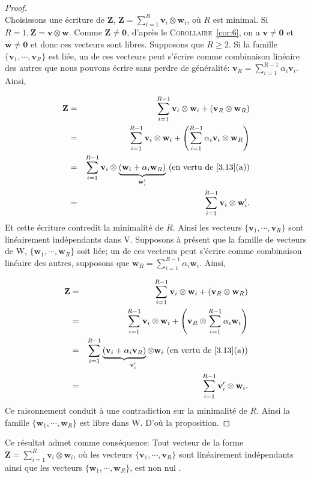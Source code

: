 \documentclass[11pt,a4paper,oneside]{book}
\newtheorem{proof}{Démonstration}
\def\ov{\mathbf 0}
\def\v{\mathbf v}
\def\z{\mathbf Z}
\def\w{\mathbf w}
\newcommand{\corref}[1]{\textsc{Corollaire}~\ref{#1}}
\begin{document}
\begin{proof}
\emph{\\}
Choisissons une écriture de $ \z $, $ \z=\sum_{i=1}^{R}\v_{i}\otimes \w_{i} $, où $ R $ est minimal. Si $ R=1 , \z=\v\otimes \w$. Comme $ \z\neq \ov $, d'après le  \corref{cor:6}, on a $ \v\neq \ov $ et $ \w\neq \ov $ et donc ces vecteurs sont libres. Supposons que $ R\geq 2 $. Si la famille $ \{\v_{1},\cdots,\v_{R}\} $ est liée, un de ces vecteurs peut s'écrire comme combinaison linéaire des autres que nous pouvons écrire sans perdre de généralité: $ \v_{R}=\sum_{i=1}^{R-1}\alpha_{i}\v_{i} $. Ainsi,

\begin{eqnarray}
\z&=&\sum_{i=1}^{R-1}\v_{i}\otimes \w_{i}+(\v_{R}\otimes \w_{R})\nonumber\\
&=&\sum_{i=1}^{R-1} \v_{i}\otimes \w_{i}+\left(\sum_{i=1}^{R-1}\alpha_{i}\v_{i}\otimes \w_{R}\right)\nonumber\\
&=&\sum_{i=1}^{R-1}\v_{i}\otimes\underset{\w'_{i}}{\underbrace{(\w_{i}+\alpha_{i}\w_{R})}} \text{ (en vertu de \eqref{3.13}(a))}\nonumber\\
&=&\sum_{i=1}^{R-1}\v_{i}\otimes \w'_{i}.\nonumber
\end{eqnarray}
 Et cette écriture contredit la minimalité de $ R $. Ainsi les vecteurs $ \{\v_{1},\cdots,\v_{R}\} $ sont linéairement indépendants dans V. Supposons à présent que la famille de vecteurs de W, $ \{\w_{1},\cdots,\w_{R}\} $ soit liée; un de ces vecteurs peut s'écrire comme combinaison linéaire des autres, supposons que $ \w_{R}=\sum_{i=1}^{R-1}\alpha_{i}\w_{i} $. Ainsi,
 
 \begin{eqnarray}
 \z&=&\sum_{i=1}^{R-1} \v_{i}\otimes \w_{i}+(\v_{R}\otimes \w_{R})\nonumber\\
 &=&\sum_{i=1}^{R-1} \v_{i}\otimes \w_{i}+\left(\v_{R}\otimes \sum_{i=1}^{R-1}\alpha_{i}\w_{i}\right)\nonumber\\
 &=&\sum_{i=1}^{R-1}\underset{\v'_{i}}{\underbrace{(\v_{i}+\alpha_{i}\v_{R})}\otimes \w_{i}} \text{ (en vertu de \eqref{3.13}(a))}\nonumber\\
 &=&\sum_{i=1}^{R-1}\v'_{i}\otimes \w_{i}.\nonumber
 \end{eqnarray} Ce raisonnement  conduit à une contradiction sur la minimalité de $ R $. Ainsi la famille $ \{\w_{1},\cdots,\w_{R}\} $ est libre dans W. D'où la proposition.
\end{proof}
Ce résultat admet comme conséquence: Tout vecteur de la forme $ \z=\sum_{i=1}^{R}\v_{i}\otimes \w_{i} $, où les vecteurs $ \{\v_{1},\cdots, \v_{R}\} $ sont linéairement indépendants ainsi que les vecteurs 
$ \{\w_{1},\cdots, \w_{R}\} $, est non nul \cite[p.105]{Michel2013}.
\end{document}
